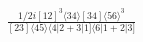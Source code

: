 \documentclass[varwidth, border=5pt]{standalone}
\begin{document}
\begin{my}
$\begin{gathered}
\scriptscriptstyle\frac{1/2i[12]^3\langle34\rangle[34]\langle56\rangle^3}{[23]\langle45\rangle\langle4|2+3|1]\langle6|1+2|3]}
\end{gathered}$
\end{my}
\end{document}
